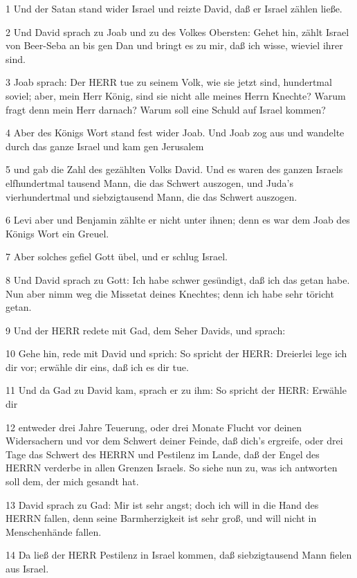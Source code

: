 \par 1 Und der Satan stand wider Israel und reizte David, daß er Israel zählen ließe.
\par 2 Und David sprach zu Joab und zu des Volkes Obersten: Gehet hin, zählt Israel von Beer-Seba an bis gen Dan und bringt es zu mir, daß ich wisse, wieviel ihrer sind.
\par 3 Joab sprach: Der HERR tue zu seinem Volk, wie sie jetzt sind, hundertmal soviel; aber, mein Herr König, sind sie nicht alle meines Herrn Knechte? Warum fragt denn mein Herr darnach? Warum soll eine Schuld auf Israel kommen?
\par 4 Aber des Königs Wort stand fest wider Joab. Und Joab zog aus und wandelte durch das ganze Israel und kam gen Jerusalem
\par 5 und gab die Zahl des gezählten Volks David. Und es waren des ganzen Israels elfhundertmal tausend Mann, die das Schwert auszogen, und Juda's vierhundertmal und siebzigtausend Mann, die das Schwert auszogen.
\par 6 Levi aber und Benjamin zählte er nicht unter ihnen; denn es war dem Joab des Königs Wort ein Greuel.
\par 7 Aber solches gefiel Gott übel, und er schlug Israel.
\par 8 Und David sprach zu Gott: Ich habe schwer gesündigt, daß ich das getan habe. Nun aber nimm weg die Missetat deines Knechtes; denn ich habe sehr töricht getan.
\par 9 Und der HERR redete mit Gad, dem Seher Davids, und sprach:
\par 10 Gehe hin, rede mit David und sprich: So spricht der HERR: Dreierlei lege ich dir vor; erwähle dir eins, daß ich es dir tue.
\par 11 Und da Gad zu David kam, sprach er zu ihm: So spricht der HERR: Erwähle dir
\par 12 entweder drei Jahre Teuerung, oder drei Monate Flucht vor deinen Widersachern und vor dem Schwert deiner Feinde, daß dich's ergreife, oder drei Tage das Schwert des HERRN und Pestilenz im Lande, daß der Engel des HERRN verderbe in allen Grenzen Israels. So siehe nun zu, was ich antworten soll dem, der mich gesandt hat.
\par 13 David sprach zu Gad: Mir ist sehr angst; doch ich will in die Hand des HERRN fallen, denn seine Barmherzigkeit ist sehr groß, und will nicht in Menschenhände fallen.
\par 14 Da ließ der HERR Pestilenz in Israel kommen, daß siebzigtausend Mann fielen aus Israel.
